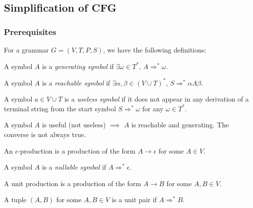 \subsection{Simplification of CFG}
\subsubsection{Prerequisites}
For a grammar $G=\left( V,T,P,S \right)$, we have the following definitions:
\begin{definition}
  A symbol $A$ is a \textit{generating symbol} if $\exists \omega\in T^{*}$,
  $A\Rightarrow ^{*} \omega$.
\end{definition}
\begin{definition}
  A symbol $A$ is a \textit{reachable symbol} if $\exists \alpha,\beta\in
  {\left( V\cup T \right)}^{*}$, $S\Rightarrow ^{*} \alpha A\beta$.
\end{definition}
\begin{definition}
  A symbol $a\in V\cup T$ is a \textit{useless symbol} if it does not
  appear in any derivation of a terminal string from the start symbol
  $S\Rightarrow ^{*}\omega$ for any $\omega\in T^{*}$.
\end{definition}
A symbol $A$ is useful (not useless) $\implies$ $A$ is reachable and
generating. The converse is not always true.
\begin{definition}
  An $\epsilon$-production is a production of the form $A\to\epsilon$ for some
  $A\in V$.
\end{definition}
\begin{definition}
  A symbol $A$ is a \textit{nullable symbol} if $A\Rightarrow ^{*}\epsilon$.
\end{definition}
\begin{definition}
  A unit production is a production of the form $A\to B$ for some
  $A,B\in V$.
\end{definition}
\begin{definition}
  A tuple $\left( A,B \right) $ for some $A,B\in V$ is a unit pair if
  $A\Rightarrow^{*} B$.
\end{definition}

